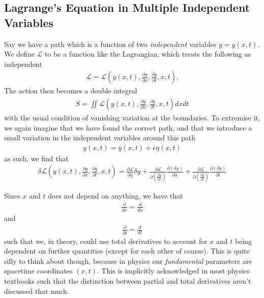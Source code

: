 \documentclass[a4paper]{article}
\begin{document}
    \subsection{Lagrange's Equation in Multiple Independent Variables}
    Say we have a path which is a function of two \textit{independent} variables \(y = y(x, t)\). We define \(\mathcal{L} \) to be a function like the Lagrangian, which treats the following as independent \begin{align*}
        \mathcal{L} = \mathcal{L} \left(y(x,t), \frac{\partial y}{\partial x}, \frac{\partial y}{\partial t}, x, t\right).
    \end{align*}
    The action then becomes a double integral \begin{align*}
        S = \iint \mathcal{L} \left(y(x,t), \frac{\partial y}{\partial x}, \frac{\partial y}{\partial t}, x, t\right) dx dt
    \end{align*}
    with the usual condition of vanishing variation at the boundaries. 
    To extremise it, we again imagine that we have found the correct path, and that we introduce a small variation in the independent variables around this path
    \begin{align*}
        y(x, t) = \overline{y}(x, t) + \epsilon \eta(x, t)
    \end{align*}
    as such, we find that \begin{align*}
        \delta \mathcal{L} \left(y(x,t), \frac{\partial y}{\partial x}, \frac{\partial y}{\partial t}, x, t\right) = \frac{\partial \mathcal{L}}{\partial y} \delta y + \frac{\partial \mathcal{L}}{\partial \left( \frac{\partial y}{\partial x}  \right)}\frac{\partial (\delta y)}{\partial x} + \frac{\partial \mathcal{L}}{\partial \left( \frac{\partial y}{\partial t}  \right)}\frac{\partial (\delta y)}{\partial t} 
    \end{align*}

    Since \(x\) and \(t\) does not depend on anything, we have that \begin{align*}
        \frac{\partial}{\partial x} = \frac{d}{dx} 
    \end{align*} 
    and \begin{align*}
        \frac{\partial }{\partial t} = \frac{d}{dt} 
    \end{align*}
    such that we, in theory, could use total derivatives to account for \(x\) and \(t\) being dependent on further quantities (except for each other of course). This is quite silly to think about though, because in physics our \textit{fundamental} parameters are spacetime coordinates \((x, t)\). This is implicitly acknowledged in most physics textbooks such that the distinction between partial and total derivatives aren't discussed that much. 
    
\end{document}
